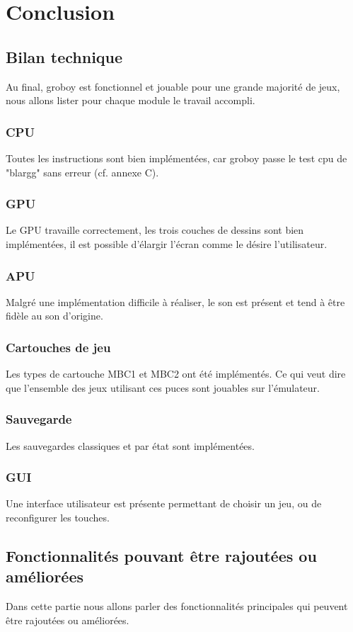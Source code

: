 \documentclass[french]{report}
\begin{document}
\chapter*{Conclusion}
\section*{Bilan technique}
Au final, groboy est fonctionnel et jouable pour une grande majorité de jeux, nous allons lister pour chaque module le travail accompli. 
\subsection*{CPU}
Toutes les instructions sont bien implémentées, car groboy passe le test cpu de "blargg" sans erreur (cf. annexe C). 
\subsection*{GPU}
Le GPU travaille correctement, les trois couches de dessins sont bien implémentées, il est possible d'élargir l'écran comme le désire l'utilisateur.
\subsection*{APU}
Malgré une implémentation difficile à réaliser, le son est présent et tend à être fidèle au son d'origine.
\subsection*{Cartouches de jeu}
Les types de cartouche MBC1 et MBC2 ont été implémentés. Ce qui veut dire que l'ensemble des jeux utilisant ces puces sont jouables sur l'émulateur.
\subsection*{Sauvegarde}
Les sauvegardes classiques et par état sont implémentées.
\subsection*{GUI}
Une interface utilisateur est présente permettant de choisir un jeu, ou de reconfigurer les touches.
\section*{Fonctionnalités pouvant être rajoutées ou améliorées}
Dans cette partie nous allons parler des fonctionnalités principales qui peuvent être rajoutées ou améliorées.
\end{document}
